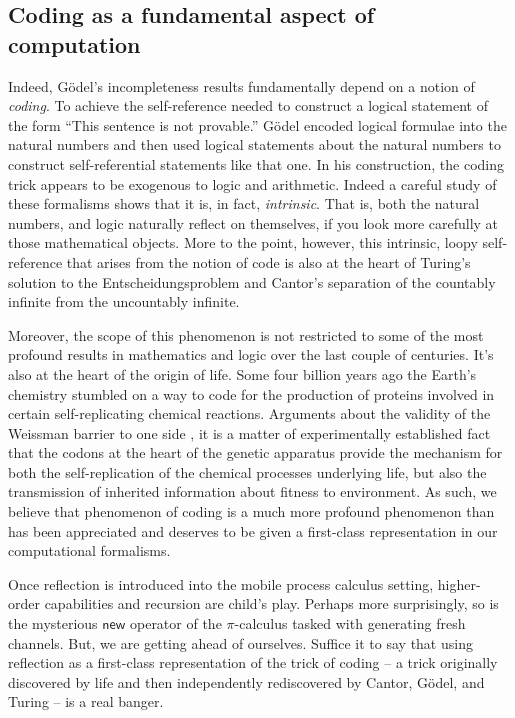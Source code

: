 \subsection{Coding as a fundamental aspect of computation}

Indeed, G\"odel's incompleteness results fundamentally depend on a
notion of \emph{coding}. To achieve the self-reference needed to
construct a logical statement of the form ``This sentence is not
provable.'' G\"odel encoded logical formulae into the natural numbers
and then used logical statements about the natural numbers to
construct self-referential statements like that one. In his
construction, the coding trick appears to be exogenous to logic and
arithmetic. Indeed a careful study of these formalisms shows that it
is, in fact, \emph{intrinsic}. That is, both the natural numbers, and
logic naturally reflect on themselves, if you look more carefully at
those mathematical objects. More to the point, however, this
intrinsic, loopy self-reference that arises from the notion of code is
also at the heart of Turing's solution to the Entscheidungsproblem and
Cantor's separation of the countably infinite from the uncountably
infinite.

Moreover, the scope of this phenomenon is not restricted to some of
the most profound results in mathematics and logic over the last
couple of centuries. It's also at the heart of the origin of
life. Some four billion years ago the Earth's chemistry stumbled on a
way to code for the production of proteins involved in certain
self-replicating chemical reactions. Arguments about the validity of
the Weissman barrier to one side \cite{William2018TheGA}, it is a
matter of experimentally established fact that the codons at the heart
of the genetic apparatus provide the mechanism for both the
self-replication of the chemical processes underlying life, but also
the transmission of inherited information about fitness to
environment. As such, we believe that phenomenon of coding is a much
more profound phenomenon than has been appreciated and deserves to be
given a first-class representation in our computational formalisms.

Once reflection is introduced into the mobile process calculus
setting, higher-order capabilities and recursion are child's
play. Perhaps more surprisingly, so is the mysterious $\mathsf{new}$
operator of the $\pi$-calculus tasked with generating fresh
channels. But, we are getting ahead of ourselves. Suffice it to say
that using reflection as a first-class representation of the trick of
coding -- a trick originally discovered by life and then independently
rediscovered by Cantor, G\"odel, and Turing -- is a real banger.

